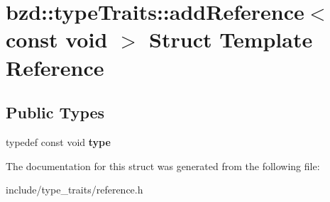 \hypertarget{structbzd_1_1typeTraits_1_1addReference_3_01const_01void_01_4}{}\section{bzd\+:\+:type\+Traits\+:\+:add\+Reference$<$ const void $>$ Struct Template Reference}
\label{structbzd_1_1typeTraits_1_1addReference_3_01const_01void_01_4}
\subsection*{Public Types}
\begin{DoxyCompactItemize}
\item 
\mbox{\label{structbzd_1_1typeTraits_1_1addReference_3_01const_01void_01_4_a656217702084331d1a60b5c786b03aff}} 
typedef const void {\bfseries type}
\end{DoxyCompactItemize}


The documentation for this struct was generated from the following file\+:\begin{DoxyCompactItemize}
\item 
include/type\+\_\+traits/reference.\+h\end{DoxyCompactItemize}
